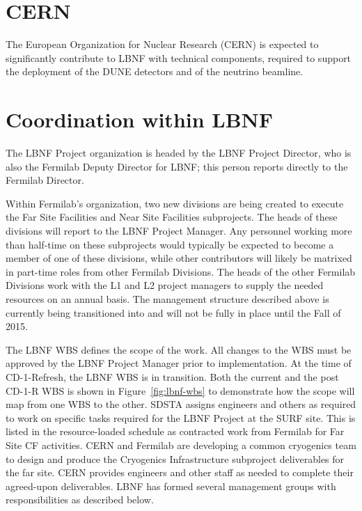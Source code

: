 \section{CERN}

The European Organization for Nuclear Research (CERN) is expected to significantly contribute to LBNF with technical components, required to support the deployment of the DUNE detectors and of the neutrino beamline. 

\section{Coordination within LBNF}

The LBNF Project organization is headed by the LBNF Project Director, who is also the Fermilab Deputy Director for LBNF; this person reports directly to the Fermilab Director. 

Within Fermilab's organization, two new divisions are being created to execute the Far Site Facilities and Near Site Facilities subprojects. The heads of these divisions will report to the LBNF Project Manager. 
Any personnel working more than half-time on these subprojects would typically be expected to become a member of one of these divisions, while other contributors will likely be matrixed in part-time roles from other Fermilab Divisions.  The heads of the other Fermilab Divisions work with the L1 and L2 project managers to supply the needed resources on an annual basis.  The management structure described above is currently being transitioned into and will not be fully in place until the Fall of 2015.  

The LBNF WBS defines the scope of the work. All changes to the WBS must be approved by the LBNF Project Manager prior to implementation. At the time of CD-1-Refresh, the LBNF WBS is in transition. Both the current and the post CD-1-R WBS is shown in Figure~\ref{fig:lbnf-wbs}  to demonstrate how the scope will map from one WBS to the other. 
SDSTA assigns engineers and others as required to work on specific tasks required for the LBNF Project at the SURF site. This is listed in the resource-loaded schedule as contracted work from Fermilab for Far Site CF activities. 
CERN and Fermilab are developing a common cryogenics team to design and produce the Cryogenics Infrastructure subproject deliverables for the far site. CERN provides engineers and other staff as needed to complete their agreed-upon deliverables.  
LBNF has formed several management groups with responsibilities as described below.

